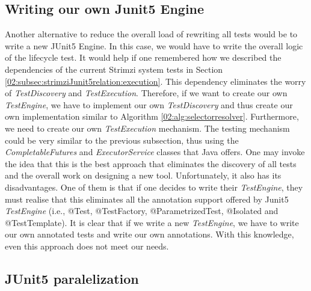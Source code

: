 \subsection{Writing our own Junit5 Engine}

Another alternative to reduce the overall load of rewriting all tests would be to write a new JUnit5 Engine.
In this case, we would have to write the overall logic of the lifecycle test.
It would help if one remembered how we described the dependencies of the current Strimzi system tests in Section \ref{02:subsec:strimziJunit5relation:execution}.
This dependency eliminates the worry of \emph{TestDiscovery} and \emph{TestExecution}.
Therefore, if we want to create our own \emph{TestEngine}, we have to implement our own \emph{TestDiscovery} and thus create our own implementation similar to Algorithm \ref{02:alg:selectorresolver}.
Furthermore, we need to create our own \emph{TestExecution} mechanism.
The testing mechanism could be very similar to the previous subsection, thus using the \emph{CompletableFutures} and \emph{ExecutorService} classes that Java offers.
One may invoke the idea that this is the best approach that eliminates the discovery of all tests and the overall work on designing a new tool.
Unfortunately, it also has its disadvantages.
One of them is that if one decides to write their \emph{TestEngine}, they must realise that this eliminates all the annotation support offered by Junit5 \emph{TestEngine} (i.e., @Test, @TestFactory, @ParametrizedTest, @Isolated and @TestTemplate).
It is clear that if we write a new \emph{TestEngine}, we have to write our own annotated tests and write our own annotations.
With this knowledge, even this approach does not meet our needs.


\subsection{JUnit5 paralelization}

